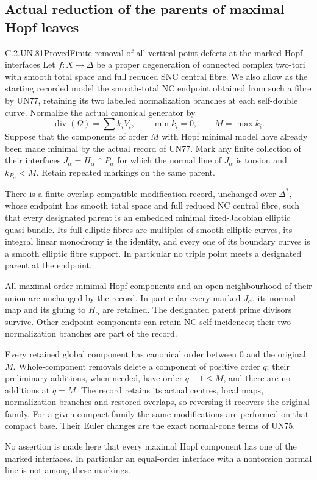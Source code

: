 \subsection{Actual reduction of the parents of maximal Hopf leaves}

\begin{statement}{C.2.UN.81}{Proved}{Finite removal of all vertical point defects at the marked Hopf interfaces}
Let \(f:X\to\Delta\) be a proper degeneration of connected
complex two-tori with smooth total space and full reduced
SNC central fibre. We also allow as the starting recorded model
the smooth-total NC endpoint obtained from such a fibre by
UN77, retaining its two labelled normalization branches at
each self-double curve. Normalize the actual canonical generator by
\[
 \operatorname{div}(\Omega)=\sum k_iV_i,\qquad
 \min k_i=0,\qquad M=\max k_i.
 \tag{C.AP.1}
\]
Suppose that the components of order \(M\) with Hopf minimal
model have already been made minimal by the actual record of
UN77. Mark any finite collection of their interfaces
\(J_\alpha=H_\alpha\cap P_\alpha\) for which the normal line of
\(J_\alpha\) is torsion and \(k_{P_\alpha}<M\).
Retain repeated markings on the same parent.

There is a finite overlap-compatible modification record,
unchanged over \(\Delta^*\), whose endpoint has smooth total
space and full reduced NC central fibre, such that every
designated parent is an embedded minimal fixed-Jacobian
elliptic quasi-bundle. Its full elliptic fibres are multiples
of smooth elliptic curves, its integral linear monodromy is
the identity, and every one of its boundary curves is a
smooth elliptic fibre support. In particular no triple point
meets a designated parent at the endpoint.

All maximal-order minimal Hopf components and an open
neighbourhood of their union are unchanged by the record.
In particular every marked \(J_\alpha\), its normal map and
its gluing to \(H_\alpha\) are retained. The designated parent
prime divisors survive. Other endpoint components can retain
NC self-incidences; their two normalization branches are
part of the record.

Every retained global component has canonical order between
\(0\) and the original \(M\). Whole-component removals delete
a component of positive order \(q\); their preliminary
additions, when needed, have order \(q+1\le M\), and there
are no additions at \(q=M\). The record retains its actual
centres, local maps, normalization branches and restored
overlaps, so reversing it recovers the original family.
For a given compact family the same modifications are
performed on that compact base. Their Euler changes are
the exact normal-cone terms of UN75.

No assertion is made here that every maximal Hopf component
has one of the marked interfaces. In particular an
equal-order interface with a nontorsion normal line is not
among these markings.
\end{statement}

